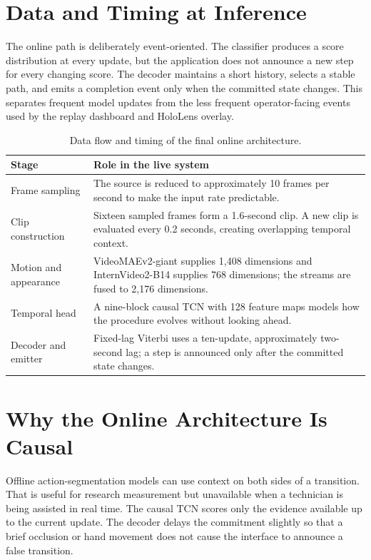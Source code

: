 \clearpage
\section{Data and Timing at Inference}

The online path is deliberately event-oriented. The classifier produces a
score distribution at every update, but the application does not announce a
new step for every changing score. The decoder maintains a short history,
selects a stable path, and emits a completion event only when the committed
state changes. This separates frequent model updates from the less frequent
operator-facing events used by the replay dashboard and HoloLens overlay.

\begin{table}[H]
\centering
\small
\begin{tabularx}{\textwidth}{@{}p{}X@{}}
\toprule
\textbf{Stage} & \textbf{Role in the live system} \\
\midrule
Frame sampling & The source is reduced to approximately 10 frames per second
to make the input rate predictable. \\
Clip construction & Sixteen sampled frames form a 1.6-second clip. A new clip
is evaluated every 0.2 seconds, creating overlapping temporal context. \\
Motion and appearance & VideoMAEv2-giant supplies 1,408 dimensions and
InternVideo2-B14 supplies 768 dimensions; the streams are fused to 2,176
dimensions. \\
Temporal head & A nine-block causal TCN with 128 feature maps models how the
procedure evolves without looking ahead. \\
Decoder and emitter & Fixed-lag Viterbi uses a ten-update, approximately
two-second lag; a step is announced only after the committed state changes. \\
\bottomrule
\end{tabularx}
\caption{Data flow and timing of the final online architecture.}
\label{tab:architecture-stages}
\end{table}

\section{Why the Online Architecture Is Causal}

Offline action-segmentation models can use context on both sides of a
transition. That is useful for research measurement but unavailable when a
technician is being assisted in real time. The causal TCN scores only the
evidence available up to the current update. The decoder delays the commitment
slightly so that a brief occlusion or hand movement does not cause the
interface to announce a false transition.

